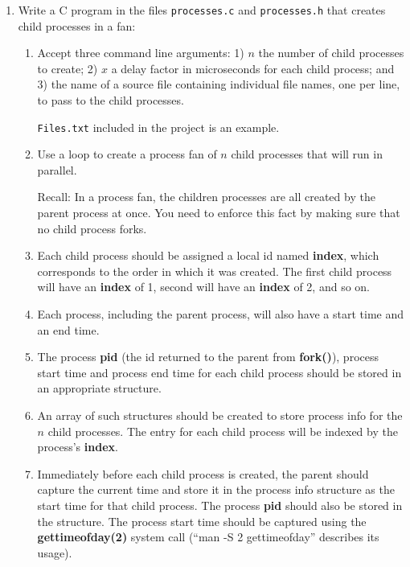 \documentclass[12pt]{article}
\begin{document}
\begin{enumerate}
  \item Write a C program in the files \texttt{processes.c} and
  \texttt{processes.h} that creates child processes in a fan:
  \begin{enumerate}
    \item Accept three command line arguments: 1) $n$ the number of
    child processes to create; 2) $x$ a delay factor in microseconds
    for each child process; and 3) the name of a source file
    containing individual file names, one per line, to pass to the
    child processes.

    \texttt{Files.txt} included in the project is an example.
					 
    \item Use a loop to create a process fan of $n$ child processes
    that will run in parallel. 

    Recall: In a process fan, the children processes are all created
    by the parent process at once.  You need to enforce this fact by
    making sure that no child process forks.
					
    \item Each child process should be assigned a local id named
    \textbf{index}, which corresponds to the order in which it was
    created.  The first child process will have an \textbf{index} of
    1, second will have an \textbf{index} of 2, and
    so on.
					
    \item Each process, including the parent process, will also have a
    start time and an end time.
					
    \item The process \textbf{pid} (the id returned to the parent from
    \textbf{fork()}), process start time and process end time for each
    child process should be stored in an appropriate structure.
					
    \item An array of such structures should be created to store
    process info for the $n$ child processes.  The entry for each child
    process will be indexed by the process's \textbf{index}.
					
    \item Immediately before each child process is created, the parent
    should capture the current time and store it in the process info
    structure as the start time for that child process.  The process
    \textbf{pid} should also be stored in the structure.  The process
    start time should be captured using the \textbf{gettimeofday(2)}
    system call (``man -S 2 gettimeofday'' describes its
    usage).
					

\end{enumerate}
\end{enumerate}
\end{document}
